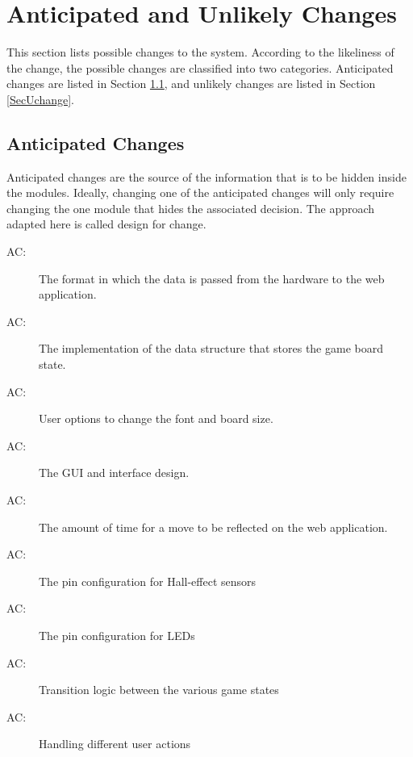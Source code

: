 \documentclass[12pt, titlepage]{article}
\newcounter{acnum}
\newcommand{\actheacnum}{AC\theacnum}
\begin{document}
\section{Anticipated and Unlikely Changes} \label{SecChange}

This section lists possible changes to the system. According to the likeliness
of the change, the possible changes are classified into two
categories. Anticipated changes are listed in Section \ref{SecAchange}, and
unlikely changes are listed in Section \ref{SecUchange}.

\subsection{Anticipated Changes} \label{SecAchange}

Anticipated changes are the source of the information that is to be hidden
inside the modules. Ideally, changing one of the anticipated changes will only
require changing the one module that hides the associated decision. The approach
adapted here is called design for
change.

\begin{description}
  \item[ \actheacnum \label{acVerification}:] The format in which the data is passed from the hardware to the web application.
  \item[ \actheacnum \label{acBoardState}:] The implementation of the data structure that stores the game board state.
  \item[ \actheacnum \label{acFontAndPieces}:] User options to change the font and board size.
  \item[ \actheacnum \label{acGUI}:] The GUI and interface design.
  \item[ \actheacnum \label{acTimers}:] The amount of time for a move to be reflected on the web application.
\item[ \actheacnum \label{acHES}:] The pin configuration for Hall-effect sensors
\item[ \actheacnum \label{acLED}:] The pin configuration for LEDs
\item[ \actheacnum \label{acTGS}:] Transition logic between the various game states
\item[ \actheacnum \label{acHUA}:] Handling different user actions
\end{description}
\end{document}
